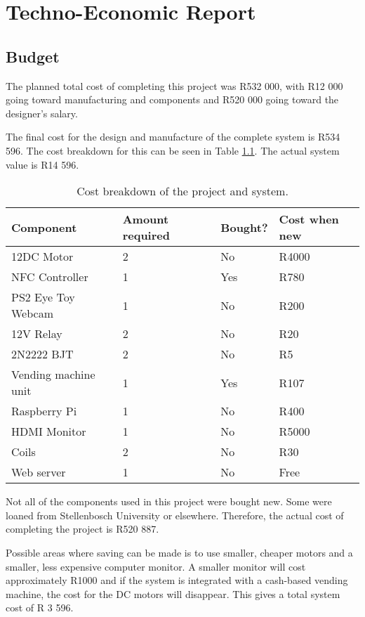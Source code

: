 \chapter{Techno-Economic Report}
\label{app:techno-economic}

\section{Budget}

The planned total cost of completing this project was R532 000, with R12 000 going toward
manufacturing and components and R520 000 going toward the designer's salary.

The final cost for the design and manufacture of the complete system is R534 596. The cost
breakdown for this can be seen in Table \ref{tab:cost-breakdown}. The actual system value
is R14 596.

\begin{table}
\caption{Cost breakdown of the project and system.}
\label{tab:cost-breakdown}
\centering
\begin{tabular}{|l|l|l|l|}
  \hline
  \textbf{Component} & \textbf{Amount required} & \textbf{Bought?} & \textbf{Cost when
  new} \\\hline\hline 
  12DC Motor & 2 & No & R4000 \\\hline
  NFC Controller & 1 & Yes & R780 \\\hline
  PS2 Eye Toy Webcam & 1 & No & R200 \\\hline
  12V Relay & 2 & No & R20 \\\hline
  2N2222 BJT & 2 & No & R5 \\\hline
  Vending machine unit & 1 & Yes & R107 \\\hline
  Raspberry Pi & 1 & No & R400 \\\hline
  HDMI Monitor & 1 & No & R5000 \\\hline
  Coils & 2 & No & R30 \\\hline
  Web server & 1 & No & Free \\\hline
\end{tabular}
\end{table}

Not all of the components used in this project were bought new. Some were loaned from
Stellenbosch University or elsewhere. Therefore, the actual cost of completing the project
is R520 887. 

Possible areas where saving can be made is to use smaller, cheaper motors and a smaller,
less expensive computer monitor. A smaller monitor will cost approximately R1000 and if
the system is integrated with a cash-based vending machine, the cost for the DC motors
will disappear. This gives a total system cost of R 3 596.

